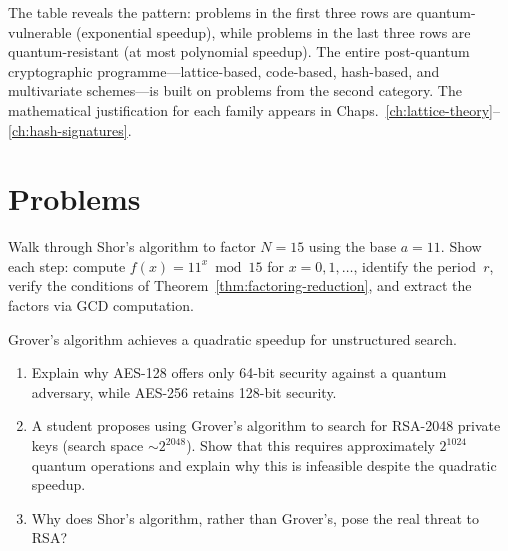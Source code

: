 The table reveals the pattern: problems in the first three rows are quantum-vulnerable (exponential speedup), while problems in the last three rows are quantum-resistant (at most polynomial speedup).  The entire post-quantum cryptographic programme---lattice-based, code-based, hash-based, and multivariate schemes---is built on problems from the second category.  The mathematical justification for each family appears in Chaps.~\ref{ch:lattice-theory}--\ref{ch:hash-signatures}.


\section*{Problems}

\begin{prob}
\label{prob:ch04-shor}
Walk through Shor's algorithm to factor $N = 15$ using the base $a = 11$.  Show each step: compute $f(x) = 11^x \bmod 15$ for $x = 0, 1, \ldots$, identify the period~$r$, verify the conditions of Theorem~\ref{thm:factoring-reduction}, and extract the factors via GCD computation.
\end{prob}

\begin{prob}
\label{prob:ch04-grover}
Grover's algorithm achieves a quadratic speedup for unstructured search.
\begin{enumerate}
\item[(a)] Explain why AES-128 offers only 64-bit security against a quantum adversary, while AES-256 retains 128-bit security.
\item[(b)] A student proposes using Grover's algorithm to search for RSA-2048 private keys (search space $\sim 2^{2048}$).  Show that this requires approximately $2^{1024}$ quantum operations and explain why this is infeasible despite the quadratic speedup.
\item[(c)] Why does Shor's algorithm, rather than Grover's, pose the real threat to RSA?
\end{enumerate}
\end{prob}

